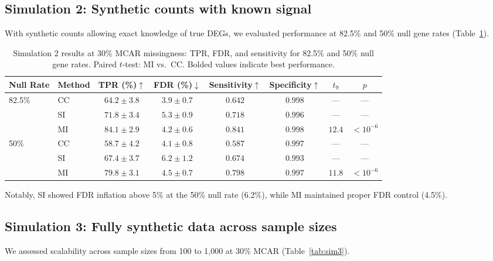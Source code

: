 \documentclass[11pt]{article}
\begin{document}
\subsection{Simulation 2: Synthetic counts with known signal}

With synthetic counts allowing exact knowledge of true DEGs, we evaluated performance at 82.5\% and 50\% null gene rates (Table~\ref{tab:sim2}).

\begin{table}[H]
\centering
\caption{Simulation 2 results at 30\% MCAR missingness: TPR, FDR, and sensitivity for 82.5\% and 50\% null gene rates. Paired $t$-test: MI vs.\ CC. Bolded values indicate best performance.}
\label{tab:sim2}
\begin{tabular}{llcccccc}
\toprule
\textbf{Null Rate} & \textbf{Method} & \textbf{TPR (\%)}$\uparrow$ & \textbf{FDR (\%)}$\downarrow$ & \textbf{Sensitivity}$\uparrow$ & \textbf{Specificity}$\uparrow$ & \textbf{$t_{9}$} & \textbf{$p$} \\
\midrule
\multirow{3}{*}{82.5\%} & CC & $64.2 \pm 3.8$ & $3.9 \pm 0.7$ & $0.642$ & $0.998$ & --- & --- \\
 & SI & $71.8 \pm 3.4$ & $5.3 \pm 0.9$ & $0.718$ & $0.996$ & --- & --- \\
 & MI & $\mathbf{84.1 \pm 2.9}$ & $\mathbf{4.2 \pm 0.6}$ & $\mathbf{0.841}$ & $\mathbf{0.998}$ & $12.4$ & $< 10^{-6}$ \\
\midrule
\multirow{3}{*}{50\%} & CC & $58.7 \pm 4.2$ & $4.1 \pm 0.8$ & $0.587$ & $0.997$ & --- & --- \\
 & SI & $67.4 \pm 3.7$ & $6.2 \pm 1.2$ & $0.674$ & $0.993$ & --- & --- \\
 & MI & $\mathbf{79.8 \pm 3.1}$ & $\mathbf{4.5 \pm 0.7}$ & $\mathbf{0.798}$ & $\mathbf{0.997}$ & $11.8$ & $< 10^{-6}$ \\
\bottomrule
\end{tabular}
\end{table}

Notably, SI showed FDR inflation above 5\% at the 50\% null rate (6.2\%), while MI maintained proper FDR control (4.5\%).

\subsection{Simulation 3: Fully synthetic data across sample sizes}

We assessed scalability across sample sizes from 100 to 1{,}000 at 30\% MCAR (Table~\ref{tab:sim3}).
\end{document}
